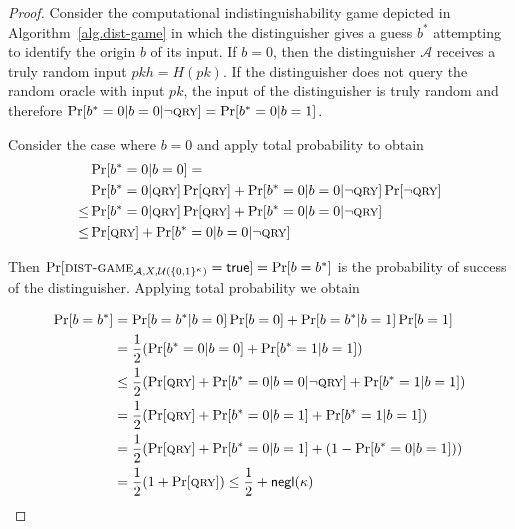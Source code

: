 \begin{proof}
  Consider the computational
  indistinguishability game depicted in
  Algorithm~\ref{alg.dist-game} in which the distinguisher gives a guess $b^*$
  attempting to identify the origin $b$ of its input.
  If $b = 0$, then the distinguisher $\mathcal{A}$ receives a truly random input
  $pkh = H(pk)$.
  If the distinguisher does not query the random oracle
  with input $pk$, the input of the distinguisher is truly random
  and therefore $\Pr[b^* = 0|b = 0|\lnot \textsc{qry}] = \Pr[b^* = 0|b = 1]$.

  Consider the case where $b = 0$ and apply total probability to obtain
  \begin{align*}
    &\Pr[b^* = 0|b = 0] =\\
    &\Pr[b^* = 0|\textsc{qry}]\Pr[\textsc{qry}] +
      \Pr[b^* = 0|b = 0|\lnot \textsc{qry}]\Pr[\lnot \textsc{qry}]\\
    \leq &\Pr[b^* = 0|\textsc{qry}]\Pr[\textsc{qry}] +
      \Pr[b^* = 0|b = 0|\lnot \textsc{qry}]\\
    \leq &\Pr[\textsc{qry}] + \Pr[b^* = 0|b = 0|\lnot \textsc{qry}]
  \end{align*}

  Then
  $
    \Pr[\textsc{dist-game}_{\mathcal{A},X,\mathcal{U}(\{0,1\}^\kappa)} = \mathsf{true}]
    =
    \Pr[b = b^*]
  $ is the probability of success of the distinguisher.
  Applying total probability we obtain

  \begin{align*}
    \Pr[b = b^*] &= \Pr[b = b^*|b = 0]\Pr[b = 0] + \Pr[b = b^*|b = 1]\Pr[b = 1]\\
                 &= \frac{1}{2}(\Pr[b^* = 0|b = 0] + \Pr[b^* = 1|b = 1])\\
                 &\leq \frac{1}{2}(\Pr[\textsc{qry}] + \Pr[b^* = 0|b = 0|\lnot \textsc{qry}]
                 + \Pr[b^* = 1|b = 1])\\
                 &= \frac{1}{2}(\Pr[\textsc{qry}] + \Pr[b^* = 0|b = 1]
                 + \Pr[b^* = 1|b = 1])\\
                 &= \frac{1}{2}(\Pr[\textsc{qry}] + \Pr[b^* = 0|b = 1]
                 + (1 - \Pr[b^* = 0|b = 1]))\\
                 &= \frac{1}{2}(1 + \Pr[\textsc{qry}]) \leq \frac{1}{2} + \textsf{negl}(\kappa)
  \end{align*}
\end{proof}

